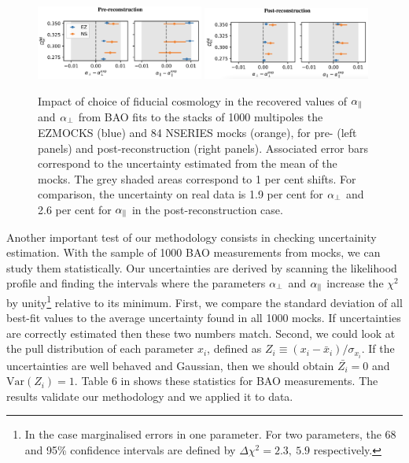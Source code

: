 \begin{figure}
    \centering 
    \includegraphics[width=0.49\textwidth]{fig/galaxies/bao_bias_prerecon.png}
    \includegraphics[width=0.49\textwidth]{fig/galaxies/bao_bias_postrecon.png}
    \caption{Impact of choice of fiducial cosmology in the recovered values
    of ${\alpha_\parallel}$ and ${\alpha_\perp}$ from BAO fits to the stacks of 1000 multipoles the \textsc{EZMOCKS} 
    (blue) and 84 \textsc{NSERIES} mocks (orange), for pre- (left panels) and post-reconstruction
    (right panels). Associated error bars correspond to the uncertainty estimated from 
    the mean of the mocks. The grey shaded areas correspond to 1 per cent shifts. 
    For comparison, the uncertainty on real data is 1.9 per cent for ${\alpha_\perp}$ 
    and 2.6 per cent for ${\alpha_\parallel}$ in the post-reconstruction case.
    }
    \label{fig:bao_bias_mocks}
\end{figure}

Another important test of our methodology consists in checking uncertainity estimation. 
With the sample of 1000 BAO measurements from mocks, we can study them statistically. 
Our uncertainties are derived by scanning the likelihood profile and finding the intervals
where the parameters ${\alpha_\perp}$ and ${\alpha_\parallel}$ increase the $\chi^2$ by 
unity\footnote{In the case marginalised errors in one parameter. For two parameters, 
the 68 and 95\% confidence intervals are defined by $\Delta \chi^2 = 2.3, \ 5.9$ respectively.} 
relative to its minimum. 
First, we compare the standard deviation of all best-fit values to the average uncertainty
found in all 1000 mocks. If uncertainties are correctly estimated then these two numbers 
match. Second, we could look at the pull distribution of each parameter $x_i$, defined as 
$Z_i \equiv (x_i - \bar{x}_i)/\sigma_{x_i}$. If the uncertainties are well behaved and Gaussian, 
then we should obtain $\bar{Z_i}=0$ and $\text{Var}(Z_i) = 1$. 
Table 6 in \cite{bautistaCompletedSDSSIVExtended2020} shows these statistics for BAO measurements. 
The results validate our methodology and we applied it to data.  

